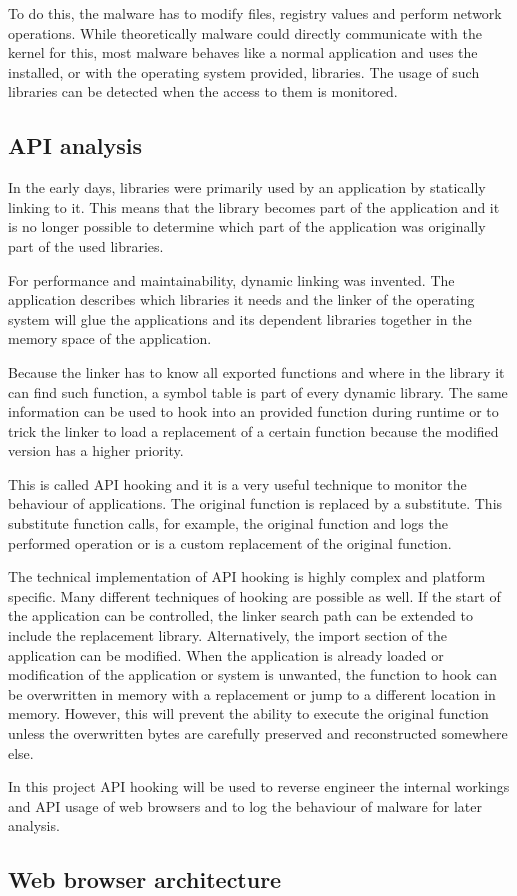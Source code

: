 To do this, the malware has to modify files, registry values  and perform network operations. While theoretically malware could directly communicate with the kernel for this, most malware behaves like a normal application and uses the installed, or with the operating system provided, libraries. The usage of such libraries can be detected when the access to them is monitored.

\subsection{API analysis}

In the early days, libraries were primarily used by an application by statically linking to it. This means that the library becomes part of the application and it is no longer possible to determine which part of the application was originally part of the used libraries.

For performance and maintainability, dynamic linking was invented. The application describes which libraries it needs and the linker of the operating system will glue the applications and its dependent libraries together in the memory space of the application. 

Because the linker has to know all exported functions and where in the library it can find such function, a symbol table is part of every dynamic library. The same information can be used to hook into an provided function during runtime or to trick the linker to load a replacement of a certain function because the modified version has a higher priority.

This is called API hooking\cite{} and it is a very useful technique to monitor the behaviour of applications. The original function is replaced by a substitute. This substitute function calls, for example, the original function and logs the performed operation or  is a custom replacement of the original function.

The technical implementation of API hooking is highly complex and platform specific. Many different techniques\cite{http://jbremer.org/x86-api-hooking-demystified/} of hooking are possible as well. If the start of the application can be controlled, the linker search path can be extended to include the replacement library. Alternatively, the import section of the application can be modified. When the application is already loaded or modification of the application or system is unwanted, the function to hook can be overwritten in memory with a replacement or jump to a different location in memory. However, this will prevent the ability to execute the original function unless the overwritten bytes are carefully preserved and reconstructed somewhere else.

In this project API hooking will be used to reverse engineer the internal workings and API usage of web browsers and to log the behaviour of malware for later analysis.

\subsection{Web browser architecture}

